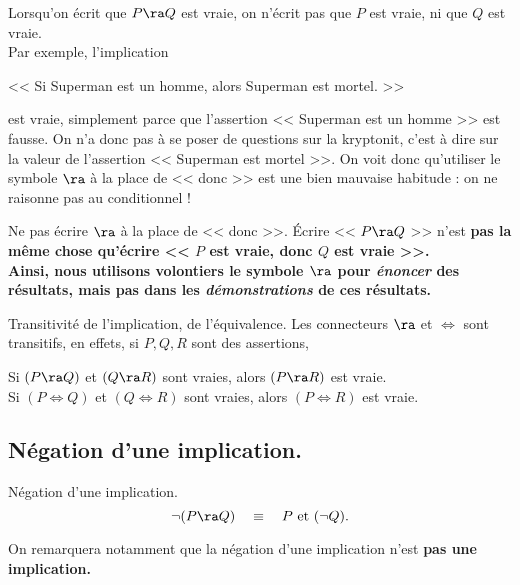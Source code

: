 \documentclass[11pt]{article}
\begin{document}
\warning Lorsqu'on écrit que $P\ra Q$ est vraie, on n'écrit pas que $P$ est vraie, ni que $Q$ est vraie.\\
Par exemple, l'implication
\begin{center}
    << Si Superman est un homme, alors Superman est mortel. >>
\end{center}
est vraie, simplement parce que l'assertion << Superman est un homme >> est fausse. On n'a donc pas à se poser de questions sur la kryptonit, c'est à dire sur la valeur de l'assertion << Superman est mortel >>.\n
On voit donc qu'utiliser le symbole $\ra$ à la place de << donc >> est une bien mauvaise habitude : on ne raisonne pas au conditionnel !
\vspace*{0.3cm}

\begin{meth}{Ne pas écrire $\ra$ à la place de << donc >>.}{}
    Écrire << $P \ra Q$ >> n'est \bf{pas la même chose} qu'écrire << $P$ est vraie, donc $Q$ est vraie >>.\\
    Ainsi, nous utilisons volontiers le symbole $\ra$ pour \emph{énoncer} des résultats, mais pas dans les \emph{démonstrations} de ces résultats.
\end{meth}

\begin{prop}{Transitivité de l'implication, de l'équivalence.}{}
    Les connecteurs $\ra$ et $\iff$ sont transitifs, en effets, si $P,Q,R$ sont des assertions,
    \begin{center}
        Si $(P \ra Q)$ et $(Q \ra R)$ sont vraies, alors $(P\ra R)$ est vraie.\\
        Si $(P \iff Q)$ et $(Q \iff R)$ sont vraies, alors $(P \iff R)$ est vraie.
    \end{center}
\end{prop}

\subsection{Négation d'une implication.}

\begin{prop}{Négation d'une implication.}{}
    \begin{equation*}
        \lnot (P \ra Q) \quad \equiv \quad P \text{ et } (\lnot Q).
    \end{equation*}
\end{prop}

\warning On remarquera notamment que la négation d'une implication n'est \bf{pas} une implication.
\end{document}
